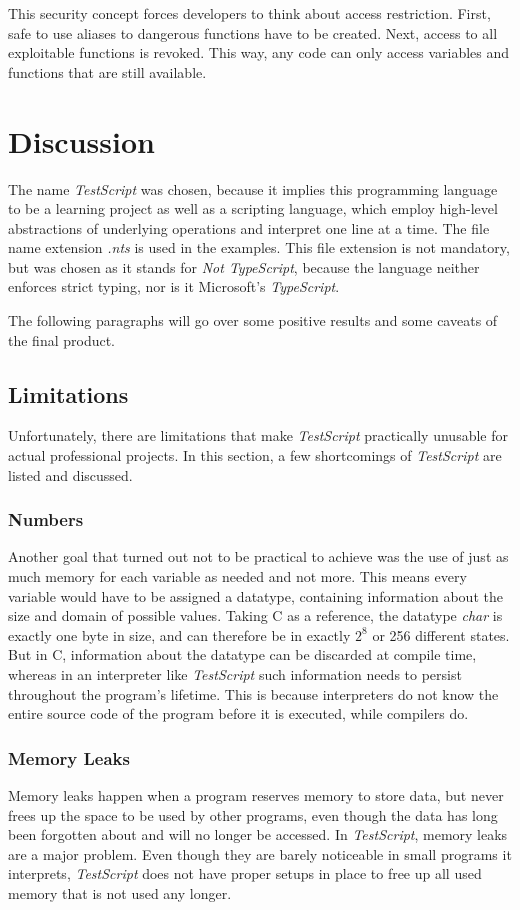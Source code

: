 \documentclass[12pt,a4paper]{article}
\newcommand{\name}{\emph{TestScript}}
\begin{document}
This security concept forces developers to think about access restriction. First, safe to use aliases
to dangerous functions have to be created. Next, access to all exploitable functions is
revoked. This way, any code can only access variables and functions that are still available.

\section{Discussion}
The name \name{} was chosen, because it implies this programming language
to be a learning project as well as a scripting language, which employ
high-level abstractions of underlying operations and interpret one line
at a time. The file name extension \emph{.nts} is used in the examples. This
file extension is not mandatory, but was chosen as it stands for \emph{Not TypeScript}, because
the language neither enforces strict typing, nor is it Microsoft's \emph{TypeScript}.

The following paragraphs will go over some positive results and some caveats of the
final product.

\subsection{Limitations}\label{Limitations}
Unfortunately, there are limitations that make \name{} practically unusable for actual
professional projects. In this section, a few shortcomings of \name{} are listed
and discussed.

\subsubsection{Numbers}
Another goal that turned out not to be practical to achieve was the use of just as much
memory for each variable as needed and not more. This means every variable would
have to be assigned a datatype, containing information about the size and domain of possible values.
Taking C as a reference, the datatype \emph{char} is exactly one byte in size, and
can therefore be in exactly $2^8$ or 256 different states. But in C, information about
the datatype can be discarded at compile time, whereas in an interpreter like \name{} such
information needs to persist throughout the program's lifetime. This is because interpreters
do not know the entire source code of the program before it is executed, while compilers do.

\subsubsection{Memory Leaks}\label{memleaks}
Memory leaks happen when a program reserves memory to store data, but
never frees up the space to be used by other programs, even though the data
has long been forgotten about and will no longer be accessed.
In \name{}, memory leaks are a major problem. Even though they are barely noticeable in small
programs it interprets, \name{} does not have proper setups in place to free up
all used memory that is not used any longer.
\end{document}
